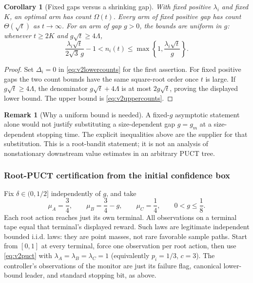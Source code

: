 \documentclass{article}
\theoremstyle{plain}
\newtheorem{corollary}[theorem]{Corollary}
\theoremstyle{definition}
\newtheorem{remark}[theorem]{Remark}
\begin{document}
\begin{corollary}[Fixed gaps versus a shrinking gap]
\label{cor:v2countscales}
With fixed positive $\lambda_i$ and fixed $K$, an optimal arm has count
$\Omega(t)$. Every arm of fixed positive gap has count
$\Theta(\sqrt t)$ as $t\to\infty$. For an arm of gap $g>0$, the bounds
are uniform in $g$: whenever $t\ge2K$ and $g\sqrt t\ge4\Lambda$,
\begin{equation}
 \frac{\lambda_i\sqrt t}{2\sqrt3\,g}-1
 < n_i(t)\le\max\!\left\{1,\frac{\lambda_i\sqrt t}{g}\right\}.
 \label{eq:v2shrinking}
\end{equation}
\end{corollary}
\begin{proof}
Set $\Delta_i=0$ in \eqref{eq:v2lowercounts} for the first assertion.
For fixed positive gaps the two count bounds have the same square-root
order once $t$ is large. If $g\sqrt t\ge4\Lambda$, the denominator
$g\sqrt t+4\Lambda$ is at most $2g\sqrt t$, proving the displayed lower
bound. The upper bound is \eqref{eq:v2uppercounts}.
\end{proof}

\begin{remark}[Why a uniform bound is needed]
A fixed-$g$ asymptotic statement alone would not justify substituting a
size-dependent gap $g=g_m$ at a size-dependent stopping time. The explicit
inequalities above are the supplier for that substitution. This is a
root-bandit statement; it is not an analysis of nonstationary downstream
value estimates in an arbitrary PUCT tree.
\end{remark}

\subsubsection{Root-PUCT certification from the initial confidence box}
\label{sec:v2horizon}
Fix $\delta\in(0,1/2]$ independently of $g$, and take
\begin{equation}
 \mu_A=\frac34,\qquad \mu_B=\frac34-g,\qquad
 \mu_C=\frac14,\qquad 0<g\le\frac18.
 \label{eq:v2means}
\end{equation}
Each root action reaches just its own terminal. All observations on a
terminal tape equal that terminal's displayed reward. Such laws are
legitimate independent bounded i.i.d. laws: they are point masses, not
rare favorable sample paths. Start from $[0,1]$ at every terminal,
force one observation per root action, then use \eqref{eq:v2puct} with
$\lambda_A=\lambda_B=\lambda_C=1$ (equivalently $p_i=1/3$, $c=3$).
The controller's observations of the monitor are just its failure flag,
canonical lower-bound leader, and standard stopping bit, as above.
\end{document}
